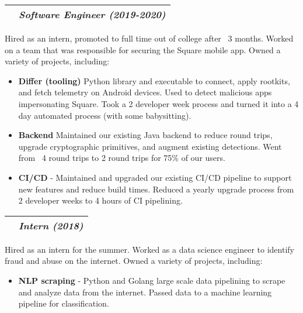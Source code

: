 \documentclass[letterpaper,10pt]{article}
\makeatletter
\newcommand{\sectiontitle}[2]{%
  \begin{tabularx}{\linewidth}{@{} X c @{}}
    {\sffamily\textbf{#1}} & {\rmfamily\textit{#2}} \\ \hline
  \end{tabularx}%
  \vspace{3pt}%
}
\newcommand{\inlineimg}[2][width=0.4cm]{%
  \begin{adjustbox}{raise=-0.2\height}%
    \texttt{[image: \#2]}%
  \end{adjustbox}%
}
\makeatother
\begin{document}
\begin{minipage}[t]{\firstcolwidth}
  \vspace{3pt}
  \sectiontitle{\inlineimg[width=11pt]{assets/square.png} Square Inc. [Mobile Security]}{Software Engineer (2019-2020)}
  Hired as an intern, promoted to full time out of college after ~3 months.
  Worked on a team that was responsible for securing the Square mobile app.
  Owned a variety of projects, including:
  \begin{itemize}[leftmargin=*,itemsep=2pt,topsep=0pt]
    \item \textbf{Differ (tooling)} Python library and executable to connect, apply rootkits, and fetch telemetry on Android devices. Used to detect malicious apps impersonating Square. Took a 2 developer week process and turned it into a 4 day automated process (with some babysitting).
    \item \textbf{Backend} Maintained our existing Java backend to reduce round trips, upgrade cryptographic primitives, and augment existing detections. Went from ~4 round trips to 2 round trips for 75\% of our users.
    \item \textbf{CI/CD} - Maintained and upgraded our existing CI/CD pipeline to support new features and reduce build times. Reduced a yearly upgrade process from 2 developer weeks to 4 hours of CI pipelining.
  \end{itemize}

  \vspace{3pt}
  \sectiontitle{\inlineimg{assets/cisco.png} Cisco Umbrella [OpenDNS]}{Intern (2018)}
  Hired as an intern for the summer. Worked as a data science engineer to identify fraud and abuse on the internet. Owned a variety of projects, including:
  \begin{itemize}[leftmargin=*,noitemsep,topsep=0pt]
    \item \textbf{NLP scraping} - Python and Golang large scale data pipelining to scrape and analyze data from the internet. Passed data to a machine learning pipeline for classification.
  \end{itemize}
\end{minipage}\hspace{\columnsep}
%
\end{document}
